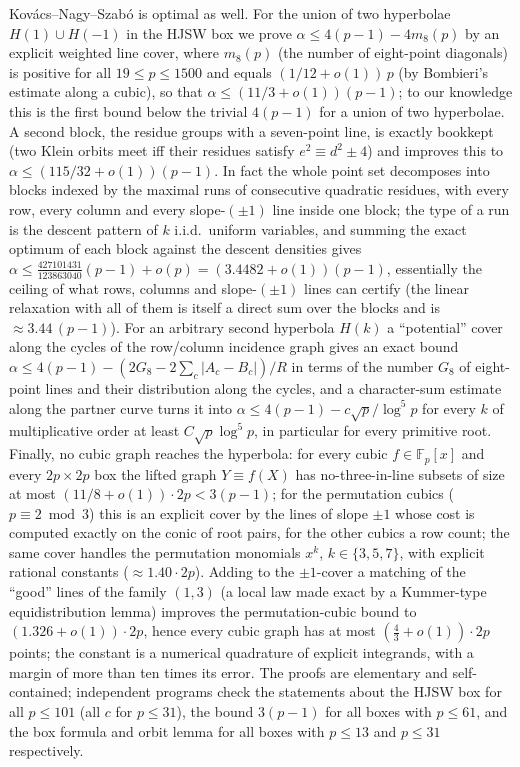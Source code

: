 \documentclass[11pt]{article}
\theoremstyle{remark}
\newcommand{\Fp}{\mathbb{F}_p}
\begin{document}
Kov\'acs--Nagy--Szab\'o is optimal as well.  For the union of two hyperbolae $H(1)\cup H(-1)$ in the HJSW box we prove
$\alpha\le4(p-1)-4m_8(p)$ by an explicit weighted line cover, where $m_8(p)$ (the number of eight-point diagonals) is positive for all
$19\le p\le1500$ and equals $(1/12+o(1))\,p$ (by Bombieri's estimate along a cubic), so that
$\alpha\le(11/3+o(1))(p-1)$; to our knowledge this is the first bound below the trivial $4(p-1)$ for a union of two hyperbolae.
A second block, the residue groups with a seven-point line, is exactly bookkept (two Klein orbits meet iff their residues satisfy
$e^2\equiv d^2\pm4$) and improves this to $\alpha\le(115/32+o(1))(p-1)$.  In fact the whole point set decomposes into blocks indexed by the
maximal runs of consecutive quadratic residues, with every row, every column and every slope-$(\pm1)$ line inside one block; the type of a run is the descent pattern of $k$
i.i.d.\ uniform variables, and summing the exact optimum of each block against the descent densities gives
$\alpha\le\tfrac{427101431}{123863040}(p-1)+o(p)=(3.4482+o(1))(p-1)$, essentially the ceiling of what rows, columns and slope-$(\pm1)$ lines
can certify (the linear relaxation with all of them is itself a direct sum over the blocks and is $\approx3.44\,(p-1)$).
For an arbitrary second hyperbola $H(k)$ a ``potential'' cover along the cycles of the row/column incidence graph gives an exact
bound $\alpha\le4(p-1)-(2G_8-2\sum_c|A_c-B_c|)/R$ in terms of the number $G_8$ of eight-point lines and their distribution along the cycles,
and a character-sum estimate along the partner curve turns it into $\alpha\le4(p-1)-c\sqrt p/\log^5p$ for every $k$ of multiplicative order
at least $C\sqrt p\log^5p$, in particular for every primitive root.  Finally, no cubic graph reaches the hyperbola: for every cubic
$f\in\Fp[x]$ and every $2p\times2p$ box the lifted graph $Y\equiv f(X)$ has no-three-in-line subsets of size at most $(11/8+o(1))\cdot2p<3(p-1)$;
for the permutation cubics ($p\equiv2\bmod3$) this is an explicit cover by the lines of slope $\pm1$ whose cost is computed exactly on the conic of
root pairs, for the other cubics a row count; the same cover handles the permutation monomials $x^k$, $k\in\{3,5,7\}$, with explicit rational constants
($\approx1.40\cdot2p$).  Adding to the $\pm1$-cover a matching of the ``good'' lines of the family $(1,3)$ (a local law made exact by a
Kummer-type equidistribution lemma) improves the permutation-cubic bound to $(1.326+o(1))\cdot2p$, hence every cubic graph has at most
$(\tfrac43+o(1))\cdot2p$ points; the constant is a numerical quadrature of explicit integrands, with a margin of more than ten times its error.
The proofs are elementary and self-contained; independent programs check the statements about the HJSW box for all
$p\le101$ (all $c$ for $p\le31$), the bound $3(p-1)$ for all boxes with $p\le61$, and the box formula and orbit lemma
for all boxes with $p\le13$ and $p\le31$ respectively.
\end{document}
